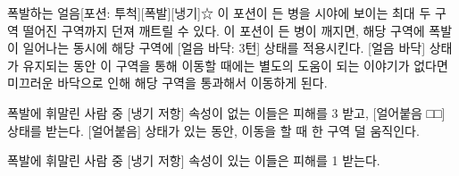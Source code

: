 \documentclass{report}
\begin{document}
	\begin{story}{폭발하는 얼음}{[포션: 투척][폭발][냉기]☆}
		이 포션이 든 병을 시야에 보이는 최대 두 구역 떨어진 구역까지 던져 깨트릴 수 있다. 이 포션이 든 병이 깨지면, 해당 구역에 폭발이 일어나는 동시에 해당 구역에 [얼음 바닥: 3턴] 상태를 적용시킨다. [얼음 바닥] 상태가 유지되는 동안 이 구역을 통해 이동할 때에는 별도의 도움이 되는 이야기가 없다면 미끄러운 바닥으로 인해 해당 구역을 통과해서 이동하게 된다.
		
		\smallskip
		
		폭발에 휘말린 사람 중 [냉기 저항] 속성이 없는 이들은 피해를 3 받고, [얼어붙음 □□] 상태를 받는다. [얼어붙음] 상태가 있는 동안, 이동을 할 때 한 구역 덜 움직인다.
		
		\smallskip
		
		폭발에 휘말린 사람 중 [냉기 저항] 속성이 있는 이들은 피해를 1 받는다.
		
	\end{story}
\end{document}
